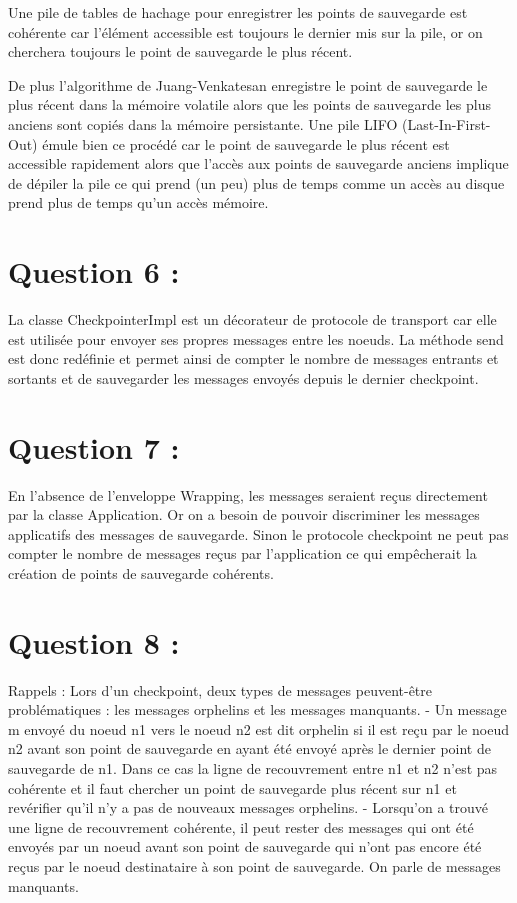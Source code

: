 \documentclass[11pt,a4paper]{report}
\begin{document}
Une pile de tables de hachage pour enregistrer les points de sauvegarde est cohérente car l'élément accessible est toujours le dernier mis sur la pile, or on cherchera toujours le point de sauvegarde le plus récent.

De plus l'algorithme de Juang-Venkatesan enregistre le point de sauvegarde le plus récent dans la mémoire volatile alors que les points de sauvegarde les plus anciens sont copiés dans la mémoire persistante.
Une pile LIFO (Last-In-First-Out) émule bien ce procédé car le point de sauvegarde le plus récent est accessible rapidement alors que l'accès aux points de sauvegarde anciens implique de dépiler la pile ce qui prend (un peu) plus de temps comme un accès au disque prend plus de temps qu'un accès mémoire. 


\section{Question 6 :}

La classe CheckpointerImpl est un décorateur de protocole de transport car elle est utilisée pour envoyer ses propres messages entre les noeuds. La méthode send est donc redéfinie et permet ainsi de compter le nombre de messages entrants et sortants et de sauvegarder les messages envoyés depuis le dernier checkpoint.


\section{Question 7 :}

En l'absence de l'enveloppe Wrapping, les messages seraient reçus directement par la classe Application. Or on a besoin de pouvoir discriminer les messages applicatifs des messages de sauvegarde. Sinon le protocole checkpoint ne peut pas compter le nombre de messages reçus par l'application ce qui empêcherait la création de points de sauvegarde cohérents.


\section{Question 8 :}

Rappels :
Lors d'un checkpoint, deux types de messages peuvent-être problématiques : les messages orphelins et les messages manquants.
- Un message m envoyé du noeud n1 vers le noeud n2 est dit orphelin si il est reçu par le noeud n2 avant son point de sauvegarde en ayant été envoyé après le dernier point de sauvegarde de n1. Dans ce cas la ligne de recouvrement entre n1 et n2 n'est pas cohérente et il faut chercher un point de sauvegarde plus récent sur n1 et revérifier qu'il n'y a pas de nouveaux messages orphelins.
- Lorsqu'on a trouvé une ligne de recouvrement cohérente, il peut rester des messages qui ont été envoyés par un noeud avant son point de sauvegarde qui n'ont pas encore été reçus par le noeud destinataire à son point de sauvegarde. On parle de messages manquants.
\end{document}
